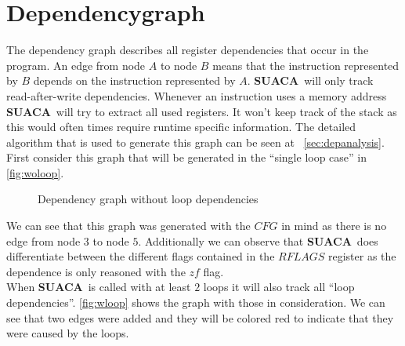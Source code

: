 \documentclass[a4paper,12pt,titlepage, twoside]{report}
\newcommand{\suaca}{\textbf{SUACA}}
\begin{document}
\FloatBarrier

\section{Dependencygraph}
The dependency graph describes all register dependencies that occur in the program. An edge from node $A$ to node $B$ means that the instruction represented by $B$ depends on the instruction represented by $A$. \suaca\ will only track read-after-write dependencies. Whenever an instruction uses a memory address \suaca\ will try to extract all used registers. It won't keep track of the stack as this would often times require runtime specific information. The detailed algorithm that is used to generate this graph can be seen at ~\autoref{sec:depanalysis}.\\
First consider this graph that will be generated in the ``single loop case'' in \autoref{fig:woloop}.\\


\begin{figure}
\centering
{}
\caption{Dependency graph without loop dependencies}
\label{fig:woloop}
\end{figure}


We can see that this graph was generated with the $CFG$ in mind as there is no edge from node $3$ to node $5$. Additionally we can observe that \suaca\ does differentiate between the different flags contained in the $RFLAGS$ register as the dependence is only reasoned with the $zf$ flag.\\
When \suaca\ is called with at least $2$ loops it will also track all ``loop dependencies''. \autoref{fig:wloop} shows the graph with those in consideration. We can see that two edges were added and they will be colored red to indicate that they were caused by the loops.
\end{document}
